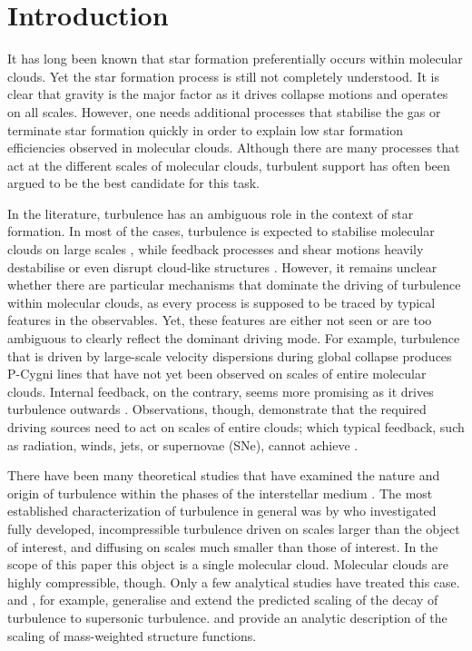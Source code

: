 \section{Introduction}\label{intro}

It has long been known that star formation preferentially occurs within molecular clouds. 
Yet the star formation process is still not completely understood.
It is clear that gravity is the major factor as it drives collapse motions and operates on all scales.
However, one needs additional processes that stabilise the gas or terminate star formation quickly in order to explain low star formation efficiencies observed in molecular clouds. 
Although there are many processes that act at the different scales of molecular clouds, turbulent support has often been argued to be the best candidate for this task.

In the literature, turbulence has an ambiguous role in the context of star formation. 
In most of the cases, turbulence is expected to stabilise molecular clouds on large scales \citep{Fleck1980,McKee1992,MacLow2003}, while feedback processes and shear motions heavily destabilise or even disrupt cloud-like structures \citep{Tan2013,Miyamoto2014}. 
However, it remains unclear whether there are particular mechanisms that dominate the driving of turbulence within molecular clouds, as every process is supposed to be traced by typical features in the observables.
Yet, these features are either not seen or are too ambiguous to clearly reflect the dominant driving mode.
For example, turbulence that is driven by large-scale velocity dispersions during global collapse \citep{Ballesteros2011a,Ballesteros2011b,Hartmann2012} produces P-Cygni lines that have not yet been observed on scales of entire molecular clouds. 
Internal feedback, on the contrary, seems more promising as it drives turbulence outwards \citep{Dekel2013,Krumholz2014}.
Observations, though, demonstrate that the required driving sources need to act on scales of entire clouds; which typical feedback, such as radiation, winds, jets, or supernovae (SNe), cannot achieve \citep{Heyer2004,Brunt2009,Brunt2013}.

There have been many theoretical studies that have examined the nature and origin of turbulence within the phases of the interstellar medium \citep[ISM;][and references within]{MacLow2004}. 
The most established characterization of turbulence in general was by \citet{Kolmogorov1941} who investigated fully developed, incompressible turbulence driven on scales larger than the object of interest, and diffusing on scales much smaller than those of interest.
In the scope of this paper this object is a single molecular cloud. 
Molecular clouds are highly compressible, though.
Only a few analytical studies have treated this case.
\citet{She1994} and \citet{Boldyrev2002}, for example, generalise and extend the predicted scaling of the decay of turbulence to supersonic turbulence.
\citet{Galtier2011} and \citet{Banerjee2013} provide an analytic description of the scaling of mass-weighted structure functions.

